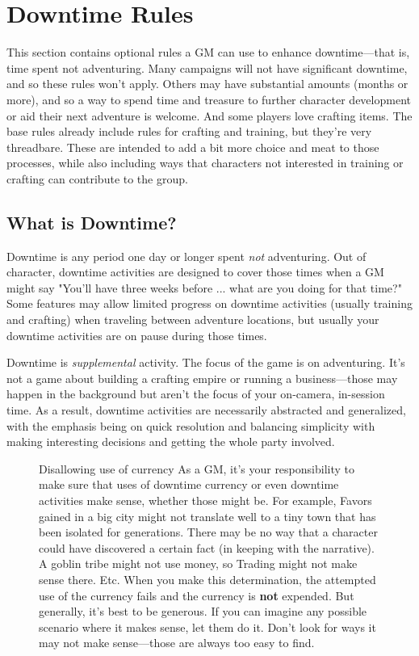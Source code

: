 \section{Downtime Rules}
This section contains optional rules a GM can use to enhance downtime---that is, time spent not adventuring. Many campaigns will not have significant downtime, and so these rules won't apply. Others may have substantial amounts (months or more), and so a way to spend time and treasure to further character development or aid their next adventure is welcome. And some players love crafting items. The base rules already include rules for crafting and training, but they're very threadbare. These are intended to add a bit more choice and meat to those processes, while also including ways that characters not interested in training or crafting can contribute to the group.

\subsection{What is Downtime?}
Downtime is any period one day or longer spent \textit{not} adventuring. Out of character, downtime activities are designed to cover those times when a GM might say "You'll have three weeks before ... what are you doing for that time?" Some features may allow limited progress on downtime activities (usually training and crafting) when traveling between adventure locations, but usually your downtime activities are on pause during those times.

Downtime is \textit{supplemental} activity. The focus of the game is on adventuring. It's not a game about building a crafting empire or running a business---those may happen in the background but aren't the focus of your on-camera, in-session time. As a result, downtime activities are necessarily abstracted and generalized, with the emphasis being on quick resolution and balancing simplicity with making interesting decisions and getting the whole party involved.

\begin{figure}[htb]
\begin{DndComment}{Disallowing use of currency}
  As a GM, it's your responsibility to make sure that uses of downtime currency or even downtime activities make sense, whether those might be. For example, Favors gained in a big city might not translate well to a tiny town that has been isolated for generations. There may be no way that a character could have discovered a certain fact (in keeping with the narrative). A goblin tribe might not use money, so Trading might not make sense there. Etc. When you make this determination, the attempted use of the currency fails and the currency is \textbf{not} expended. But generally, it's best to be generous. If you can imagine any possible scenario where it makes sense, let them do it. Don't look for ways it may not make sense---those are always too easy to find.
\end{DndComment} 
\end{figure}

